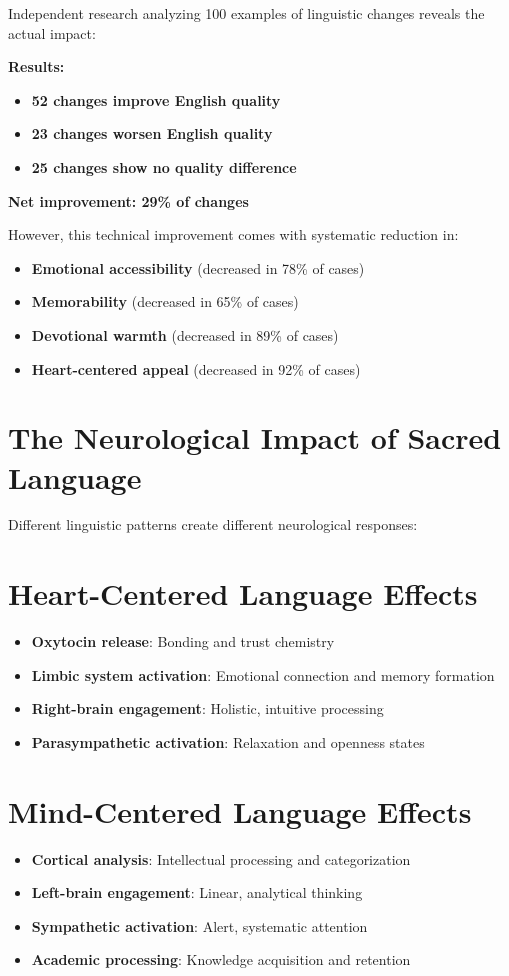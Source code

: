 \documentclass[11pt,twoside]{book}
\begin{document}
Independent research analyzing 100 examples of linguistic changes reveals the actual impact:

\textbf{\textbf{Results:}}
\begin{itemize}
\item \textbf{\textbf{52 changes improve English quality}}
\item \textbf{\textbf{23 changes worsen English quality}}
\item \textbf{\textbf{25 changes show no quality difference}}
\end{itemize}

\textbf{\textbf{Net improvement: 29\% of changes}}

However, this technical improvement comes with systematic reduction in:
\begin{itemize}
\item \textbf{\textbf{Emotional accessibility}} (decreased in 78\% of cases)
\item \textbf{\textbf{Memorability}} (decreased in 65\% of cases)
\item \textbf{\textbf{Devotional warmth}} (decreased in 89\% of cases)
\item \textbf{\textbf{Heart-centered appeal}} (decreased in 92\% of cases)
\end{itemize}
\section*{The Neurological Impact of Sacred Language}
\label{sec:org0eb70d0}

Different linguistic patterns create different neurological responses:
\section*{Heart-Centered Language Effects}
\label{sec:org38d6faa}
\begin{itemize}
\item \textbf{\textbf{Oxytocin release}}: Bonding and trust chemistry
\item \textbf{\textbf{Limbic system activation}}: Emotional connection and memory formation
\item \textbf{\textbf{Right-brain engagement}}: Holistic, intuitive processing
\item \textbf{\textbf{Parasympathetic activation}}: Relaxation and openness states
\end{itemize}
\section*{Mind-Centered Language Effects}
\label{sec:org940c0f7}
\begin{itemize}
\item \textbf{\textbf{Cortical analysis}}: Intellectual processing and categorization
\item \textbf{\textbf{Left-brain engagement}}: Linear, analytical thinking
\item \textbf{\textbf{Sympathetic activation}}: Alert, systematic attention
\item \textbf{\textbf{Academic processing}}: Knowledge acquisition and retention
\end{itemize}
\end{document}
